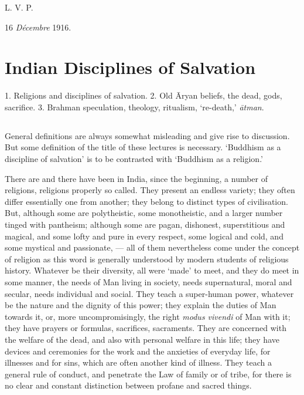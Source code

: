 \documentclass[a4paper, 11pt, oneside, english]{article}
\begin{document}
\bigskip

L. V. P.

\bigskip

16 \emph{Décembre} 1916.
\clearpage
\section{Indian Disciplines of Salvation}
\begin{center}\footnotesize
1. Religions and disciplines of salvation. 2. Old Āryan beliefs, the dead, gods, sacrifice. 3. Brahman speculation, theology, ritualism, `re-death,' \emph{ātman}.
\end{center}
\subsection{}
\paragraph{}
General definitions are always somewhat misleading and give rise to discussion. But some definition of the title of these lectures is necessary. `Buddhism as a discipline of salvation' is to be contrasted with `Buddhism as a religion.'

There are and there have been in India, since the beginning, a number of religions, religions properly so called. They present an endless variety; they often differ essentially one from another; they belong to distinct types of civilisation. But, although some are polytheistic, some monotheistic, and a larger number tinged with pantheism; although some are pagan, dishonest, superstitious and magical, and some lofty and pure in every respect, some logical and cold, and some mystical and passionate, --- all of them nevertheless come under the concept of religion as this word is generally understood by modern students of religious history. Whatever be their diversity, all were `made' to meet, and they do meet in some manner, the needs of Man living in society, needs supernatural, moral and secular, needs individual and social. They teach a super-human power, whatever be the nature and the dignity of this power; they explain the duties of Man towards it, or, more uncompromisingly, the right \emph{modus vivendi} of Man with it; they have prayers or formulas, sacrifices, sacraments. They are concerned with the welfare of the dead, and also with personal welfare in this life; they have devices and ceremonies for the work and the anxieties of everyday life, for illnesses and for sins, which are often another kind of illness. They teach a general rule of conduct, and penetrate the Law of family or of tribe, for there is no clear and constant distinction between profane and sacred things.
\end{document}
